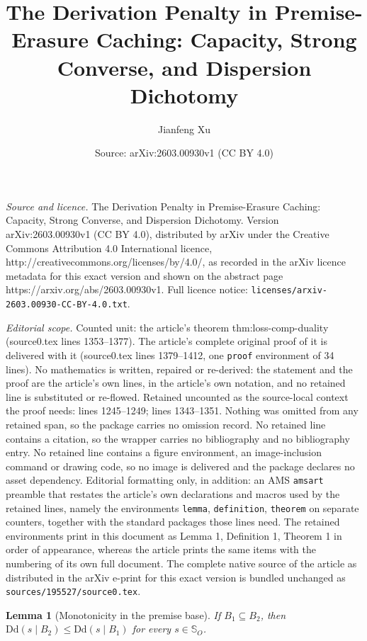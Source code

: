 \documentclass[10pt,a4paper]{amsart}
\title{The Derivation Penalty in Premise-Erasure Caching: Capacity, Strong Converse, and Dispersion Dichotomy}
\author{Jianfeng Xu}
\date{Source: arXiv:2603.00930v1 (CC BY 4.0)}
\newtheorem{lemma}{Lemma}
\newcommand{\Dd}{\text{Dd}}
\begin{document}
\maketitle

\noindent\emph{Source and licence.} The Derivation Penalty in Premise-Erasure Caching: Capacity, Strong Converse, and Dispersion Dichotomy. Version arXiv:2603.00930v1 (CC BY 4.0), distributed by arXiv under the Creative Commons Attribution 4.0 International licence, http://creativecommons.org/licenses/by/4.0/, as recorded in the arXiv licence metadata for this exact version and shown on the abstract page https://arxiv.org/abs/2603.00930v1. Full licence notice: \texttt{licenses/arxiv-2603.00930-CC-BY-4.0.txt}.\par\smallskip

\noindent\textit{Editorial scope.} Counted unit: the article's theorem thm:loss-comp-duality (source0.tex lines 1353--1377). The article's complete original proof of it is delivered with it (source0.tex lines 1379--1412, one \texttt{proof} environment of 34 lines). No mathematics is written, repaired or re-derived: the statement and the proof are the article's own lines, in the article's own notation, and no retained line is substituted or re-flowed.  Retained uncounted as the source-local context the proof needs: lines 1245--1249; lines 1343--1351.  Nothing was omitted from any retained span, so the package carries no omission record.  No retained line contains a citation, so the wrapper carries no bibliography and no bibliography entry.  No retained line contains a figure environment, an image-inclusion command or drawing code, so no image is delivered and the package declares no asset dependency.  Editorial formatting only, in addition: an AMS \texttt{amsart} preamble that restates the article's own declarations and macros used by the retained lines, namely the environments \texttt{lemma}, \texttt{definition}, \texttt{theorem} on separate counters, together with the standard packages those lines need.  The retained environments print in this document as Lemma 1, Definition 1, Theorem 1 in order of appearance, whereas the article prints the same items with the numbering of its own full document.  The complete native source of the article as distributed in the arXiv e-print for this exact version is bundled unchanged as \texttt{sources/195527/source0.tex}.
\begin{lemma}[Monotonicity in the premise base]
\label{lem:premise-monotonicity-sec3}
If $B_1\subseteq B_2$, then $\Dd(s\mid B_2)\le\Dd(s\mid B_1)$
for every $s\in\mathbb S_O$.
\end{lemma}
\end{document}
